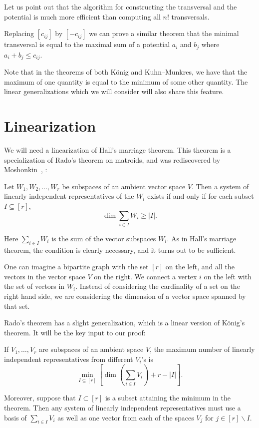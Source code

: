\begin{rema} \label{n!} Let us point out that the algorithm for constructing the transversal and the potential is much more efficient than computing all $n!$ transversals.
\end{rema}

Replacing $[c_{ij}]$ by $[-c_{ij}]$ we can prove a similar theorem that the minimal transversal is equal to the maximal sum of a potential $a_i$ and $b_j$ where $a_i + b_j \leq c_{ij}$.

Note that in the theorems of both K{\"o}nig and Kuhn--Munkres, we have that the maximum of one quantity is equal to the minimum of some other quantity. The linear generalizations which we will consider will also share this feature.


\section{Linearization}\label{sect3}

We will need a linearization of Hall's marriage theorem. This theorem is a specialization of Rado's theorem on matroids, and was rediscovered by Moshonkin~\cite{R}, \cite{M}:
\begin{theorem}[Rado] \label{lin1}
Let $W_1, W_2, \dots, W_r$ be subspaces of an ambient vector space $V$. Then a system of linearly independent representatives of the $W_i$ exists if and only if for each subset $I \subseteq [r]$,
\[
 \dim \sum_{i \in I} W_i \geq |I|.
\]
\end{theorem}

Here $\sum_{i \in I} W_i$ is the sum of the vector subspaces $W_i$. As in Hall's marriage theorem, the condition is clearly necessary, and it turns out to be sufficient. 

One can imagine a bipartite graph with the set $[r]$ on the left, and all the vectors in the vector space $V$ on the right. We connect a vertex $i$ on the left with the set of vectors in $W_i$. Instead of considering the cardinality of a set on the right hand side, we are considering the dimension of a vector space spanned by that set.

Rado's theorem has a slight generalization, which is a linear version of K{\"o}nig's theorem. It will be the key input to our proof:

\begin{prop}[\cite{LO}]\label{lin2}
If $V_1,\ldots,V_r$ are subspaces of an ambient space $V$, the maximum number of linearly independent representatives from different $V_i$'s is
 \begin{equation}\label{eq:vsKonig}
 \min_{I \subseteq [r]} \left[ \dim \left( \sum_{i\in I} V_i \right) + r - |I| \right].
 \end{equation}
\end{prop}
Moreover, suppose that $I \subset [r]$ is a subset attaining the minimum in the theorem. Then any system of linearly independent representatives must use a basis of $\sum_{i\in I} V_i$ as well as one vector from each of the spaces $V_j$ for $j \in [r] \backslash I$.

